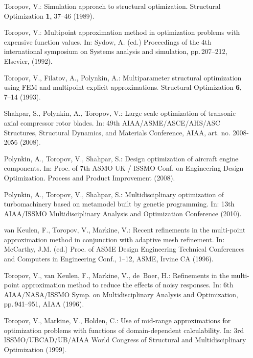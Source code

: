\documentclass[runningheads,a4paper]{llncs}
\begin{document}
\begin{thebibliography}{10}

Toropov, V.:
\newblock Simulation approach to structural optimization.
\newblock Structural Optimization \textbf{1}, 37--46 (1989).

Toropov, V.:
\newblock Multipoint approximation method in optimization problems with expensive function values.
\newblock In: Sydow, A. (ed.) Proceedings of the 4th international symposium on Systems analysis and simulation,
pp.\,207--212, Elsevier,  (1992).

Toropov, V., Filatov, A., Polynkin, A.:
\newblock Multiparameter structural optimization using FEM and multipoint explicit approximations.
\newblock Structural Optimization \textbf{6}, 7--14 (1993).

Shahpar, S., Polynkin, A., Toropov, V.:
\newblock Large scale optimization of transonic axial compressor rotor blades.
\newblock In:  49th AIAA/ASME/ASCE/AHS/ASC Structures, Structural Dynamics, and Materials Conference, AIAA, art. no. 2008-2056
(2008).

Polynkin, A., Toropov, V., Shahpar, S.:
\newblock Design optimization of aircraft engine components.
\newblock In: Proc. of 7th ASMO UK / ISSMO Conf. on Engineering Design Optimization. Process and Product Improvement
(2008).

Polynkin, A., Toropov, V., Shahpar, S.:
\newblock Multidisciplinary optimization of turbomachinery based on metamodel built by genetic programming.
\newblock In: 13th AIAA/ISSMO Multidisciplinary Analysis and Optimization Conference
(2010).

van Keulen, F., Toropov, V., Markine, V.:
\newblock Recent refinements in the multi-point approximation method in conjunction with adaptive mesh refinement.
\newblock In: McCarthy, J.M. (ed.) Proc. of ASME Design Engineering Technical Conferences and Computers
  in Engineering Conf., 1--12, ASME, Irvine CA (1996).

Toropov, V., van Keulen, F., Markine, V., de~Boer, H.:
\newblock Refinements in the multi-point approximation method to reduce the effects of noisy responses.
\newblock In: 6th AIAA/NASA/ISSMO Symp. on Multidisciplinary Analysis and Optimization,  pp.\,941--951, AIAA
(1996).

Toropov, V., Markine, V., Holden, C.:
\newblock Use of mid-range approximations for optimization problems with functions of domain-dependent calculability.
\newblock In: 3rd ISSMO/UBCAD/UB/AIAA World Congress of Structural and Multidisciplinary Optimization (1999).


\end{thebibliography}
\end{document}
